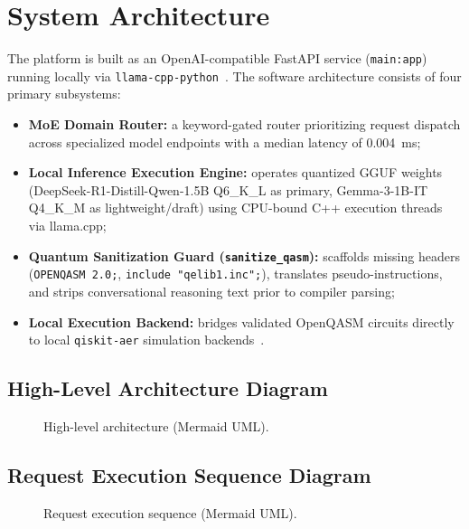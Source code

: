\documentclass[journal]{IEEEtran}
\begin{document}
\section{System Architecture}
The platform is built as an OpenAI-compatible FastAPI service (\texttt{main:app})
running locally via \texttt{llama-cpp-python}~\cite{llamacpp}. The software
architecture consists of four primary subsystems:
\begin{itemize}
\item \textbf{MoE Domain Router:} a keyword-gated router prioritizing request
dispatch across specialized model endpoints with a median latency of 0.004~ms;
\item \textbf{Local Inference Execution Engine:} operates quantized GGUF weights
(DeepSeek-R1-Distill-Qwen-1.5B Q6\_K\_L as primary, Gemma-3-1B-IT Q4\_K\_M as
lightweight/draft) using CPU-bound C++ execution threads via llama.cpp;
\item \textbf{Quantum Sanitization Guard (\texttt{sanitize\_qasm}):} scaffolds
missing headers (\texttt{OPENQASM 2.0;}, \texttt{include "qelib1.inc";}),
translates pseudo-instructions, and strips conversational reasoning text prior
to compiler parsing;
\item \textbf{Local Execution Backend:} bridges validated OpenQASM circuits
directly to local \texttt{qiskit-aer} simulation
backends~\cite{qiskit}.
\end{itemize}

\subsection{High-Level Architecture Diagram}
\begin{figure}[!t]
\centering
\caption{High-level architecture (Mermaid UML).}
\label{fig:arch}
\end{figure}

\subsection{Request Execution Sequence Diagram}
\begin{figure}[!t]
\centering
\caption{Request execution sequence (Mermaid UML).}
\label{fig:seq}
\end{figure}
\end{document}
